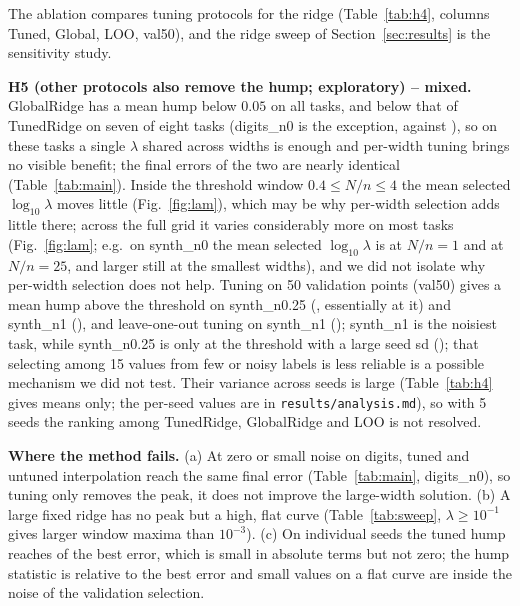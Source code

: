 The ablation compares tuning protocols for the ridge (Table~\ref{tab:h4}, columns Tuned, Global, LOO, val50), and the ridge sweep of Section~\ref{sec:results} is the sensitivity study.

\textbf{H5 (other protocols also remove the hump; exploratory) -- mixed.} GlobalRidge has a mean hump below $0.05$ on all tasks, and below that of TunedRidge on seven of eight tasks (digits\_n0 is the exception,  against ), so on these tasks a single $\lambda$ shared across widths is enough and per-width tuning brings no visible benefit; the final errors of the two are nearly identical (Table~\ref{tab:main}). Inside the threshold window $0.4\le N/n\le4$ the mean selected $\log_{10}\lambda$ moves little (Fig.~\ref{fig:lam}), which may be why per-width selection adds little there; across the full grid it varies considerably more on most tasks (Fig.~\ref{fig:lam}; e.g.\ on synth\_n0 the mean selected $\log_{10}\lambda$ is  at $N/n=1$ and  at $N/n=25$, and larger still at the smallest widths), and we did not isolate why per-width selection does not help. Tuning on 50 validation points (val50) gives a mean hump above the threshold on synth\_n0.25 (, essentially at it) and synth\_n1 (), and leave-one-out tuning on synth\_n1 (); synth\_n1 is the noisiest task, while synth\_n0.25 is only at the threshold with a large seed sd (); that selecting among 15 values from few or noisy labels is less reliable is a possible mechanism we did not test. Their variance across seeds is large (Table~\ref{tab:h4} gives means only; the per-seed values are in \texttt{results/analysis.md}), so with 5 seeds the ranking among TunedRidge, GlobalRidge and LOO is not resolved.

\textbf{Where the method fails.} (a) At zero or small noise on digits, tuned and untuned interpolation reach the same final error (Table~\ref{tab:main}, digits\_n0), so tuning only removes the peak, it does not improve the large-width solution. (b) A large fixed ridge has no peak but a high, flat curve (Table~\ref{tab:sweep}, $\lambda\ge10^{-1}$ gives larger window maxima than $10^{-3}$). (c) On individual seeds the tuned hump reaches  of the best error, which is small in absolute terms but not zero; the hump statistic is relative to the best error and small values on a flat curve are inside the noise of the validation selection.
